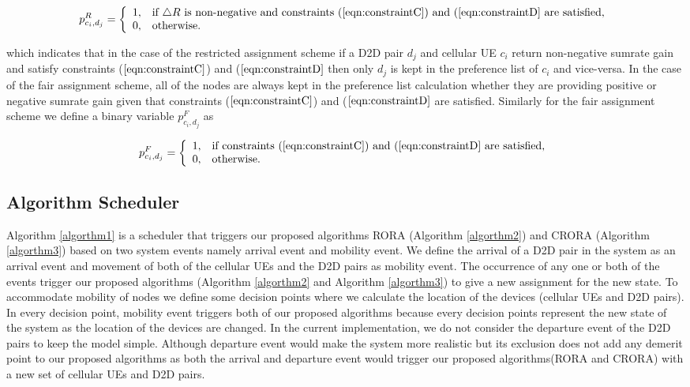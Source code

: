 \documentclass[times]{dacauth}
\begin{document}
\[ p_{c_i,d_j}^{R} = \left\{ \begin{array}{ll}
         1, & \mbox{if $\triangle R$ is non-negative and constraints ($\ref{eqn:constraintC}$) and ($\ref{eqn:constraintD}$ are satisfied,}\\
         0, & \mbox{otherwise}.\end{array} \right. \]

\noindent         
which indicates that in the case of the restricted assignment scheme if a D2D pair $d_j$ and cellular UE $c_i$ return non-negative sumrate gain and satisfy constraints ($\ref{eqn:constraintC}$) and ($\ref{eqn:constraintD}$ then only  $d_j$ is kept in the preference list of $c_i$ and vice-versa.        
\noindent
In the case of the fair assignment scheme, all of the nodes are always kept in the preference list calculation whether they are providing positive or negative sumrate gain given that constraints ($\ref{eqn:constraintC}$) and ($\ref{eqn:constraintD}$ are satisfied. Similarly for the fair assignment scheme we define a binary variable $p_{c_i,d_j}^{F}$ as  

\[ p_{c_i,d_j}^{F} = \left\{ \begin{array}{ll}
         1, & \mbox{if constraints  ($\ref{eqn:constraintC}$) and ($\ref{eqn:constraintD}$ are satisfied,}\\
         0, & \mbox{otherwise}.\end{array} \right. \]  
 

\smallskip


\subsection{Algorithm Scheduler}
\smallskip
\noindent
Algorithm \ref{algorthm1} is a scheduler that triggers our proposed algorithms RORA (Algorithm \ref{algorthm2}) and CRORA (Algorithm \ref{algorthm3}) based on two system events namely arrival event and mobility event. We define the arrival of a D2D pair in the system as an arrival event and movement of both of the cellular UEs and the D2D pairs as mobility event. The occurrence of any one or both of the events trigger our proposed algorithms (Algorithm \ref{algorthm2} and Algorithm \ref{algorthm3}) to give a new assignment for the new state. To accommodate mobility of nodes we define some decision points where we calculate the location of the devices (cellular UEs and D2D pairs). In every decision point, mobility event triggers both of our proposed algorithms because every decision points represent the new state of the system as the location of the devices are changed. In the current implementation, we do not consider the departure event of the D2D pairs to keep the model simple. Although departure event would make the system more realistic but its exclusion does not add any demerit point to our proposed algorithms as both the arrival and departure event would trigger our proposed algorithms(RORA and CRORA) with a new set of cellular UEs and D2D pairs.
\end{document}
